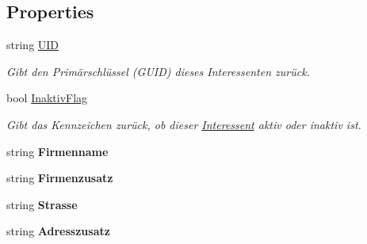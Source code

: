\subsection*{Properties}
\begin{DoxyCompactItemize}
\item 
string \hyperlink{class_products_1_1_model_1_1_entities_1_1_interessent_a79f2a567b88224628d9a6234ee58d8ba}{U\+ID}
\begin{DoxyCompactList}\small\item\em Gibt den Primärschlüssel (G\+U\+ID) dieses Interessenten zurück. \end{DoxyCompactList}\item 
bool \hyperlink{class_products_1_1_model_1_1_entities_1_1_interessent_a887bec805197b160a26c821200575c5b}{Inaktiv\+Flag}
\begin{DoxyCompactList}\small\item\em Gibt das Kennzeichen zurück, ob dieser \hyperlink{class_products_1_1_model_1_1_entities_1_1_interessent}{Interessent} aktiv oder inaktiv ist. \end{DoxyCompactList}\item 
string {\bfseries Firmenname}\hypertarget{class_products_1_1_model_1_1_entities_1_1_interessent_a659e78698e0552e8786f76ae79ab1b33}{}\label{class_products_1_1_model_1_1_entities_1_1_interessent_a659e78698e0552e8786f76ae79ab1b33}

\item 
string {\bfseries Firmenzusatz}\hypertarget{class_products_1_1_model_1_1_entities_1_1_interessent_a83b3b103db1105b4c3322fda3dd4663a}{}\label{class_products_1_1_model_1_1_entities_1_1_interessent_a83b3b103db1105b4c3322fda3dd4663a}

\item 
string {\bfseries Strasse}\hypertarget{class_products_1_1_model_1_1_entities_1_1_interessent_ac9fea6cdfae91bb6bdfea10bcb31b16c}{}\label{class_products_1_1_model_1_1_entities_1_1_interessent_ac9fea6cdfae91bb6bdfea10bcb31b16c}

\item 
string {\bfseries Adresszusatz}\hypertarget{class_products_1_1_model_1_1_entities_1_1_interessent_a28b447938dee55fa8b68f4aed08c004a}{}\label{class_products_1_1_model_1_1_entities_1_1_interessent_a28b447938dee55fa8b68f4aed08c004a}


\end{DoxyCompactItemize}
